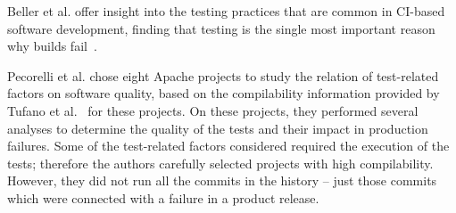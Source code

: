 


Beller et al. offer insight into the testing practices that are common in CI-based software development, finding that testing is the single most important reason why builds fail~\cite{beller2017oops}.

Pecorelli et al. chose eight Apache projects to study the relation of test-related factors on software quality, based on the compilability information provided by Tufano et al.~\cite{tufano2017there} for these projects. On these projects, they performed several analyses to determine the quality of the tests and their impact in production failures. Some of the test-related factors considered required the execution of the tests; therefore the authors carefully selected projects with high compilability. However, they did not run all the commits in the history -- just those commits which were connected with a failure in a product release. 

